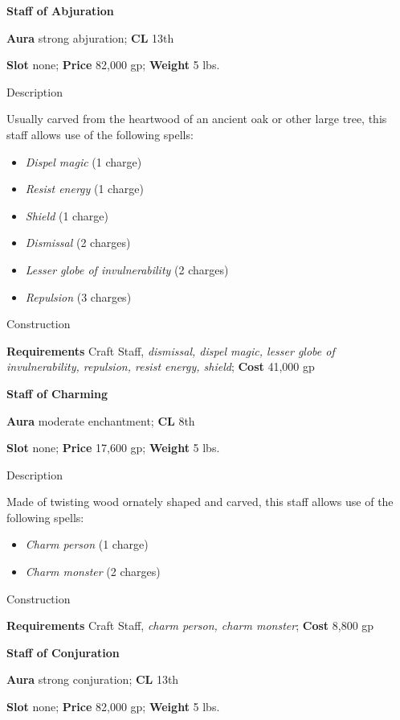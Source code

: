 \textbf{Staff of Abjuration}
				
\textbf{Aura} strong abjuration; \textbf{CL} 13th
				
\textbf{Slot} none; \textbf{Price} 82,000 gp; \textbf{Weight} 5 lbs.
				
Description
				
Usually carved from the heartwood of an ancient oak or other large tree, this staff allows use of the following spells:
				\begin{itemize}\item  \textit{Dispel magic} (1 charge)
				\item  \textit{Resist energy} (1 charge)
				\item  \textit{Shield} (1 charge)
				\item  \textit{Dismissal} (2 charges)
				\item  \textit{Lesser globe of invulnerability} (2 charges)
				\item  \textit{Repulsion} (3 charges) 
\end{itemize}
				
Construction
				
\textbf{Requirements} Craft Staff, \textit{dismissal, dispel magic, lesser globe of invulnerability, repulsion, resist energy, shield}; \textbf{Cost }41,000 gp
				
\textbf{Staff of Charming}
				
\textbf{Aura} moderate enchantment;\textbf{ CL }8th
				
\textbf{Slot} none; \textbf{Price} 17,600 gp; \textbf{Weight} 5 lbs.
				
Description
				
Made of twisting wood ornately shaped and carved, this staff allows use of the following spells:
				\begin{itemize}\item  \textit{Charm person} (1 charge)
				\item  \textit{Charm monster} (2 charges) 
\end{itemize}
				
Construction
				
\textbf{Requirements} Craft Staff, \textit{charm person, charm monster}; \textbf{Cost }8,800 gp
				
\textbf{Staff of Conjuration}
				
\textbf{Aura} strong conjuration; \textbf{CL} 13th
				
\textbf{Slot} none; \textbf{Price} 82,000 gp; \textbf{Weight} 5 lbs.
				
